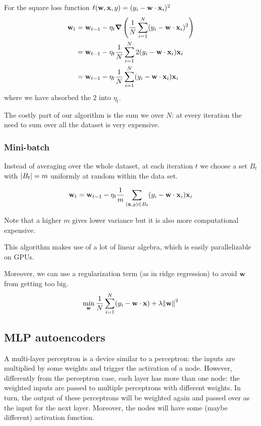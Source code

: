 \documentclass[12pt]{extarticle}
\renewcommand{\vec}[1]{\bvec{#1}}
\begin{document}
For the square loss function $\ell(\vec w, \vec x, y) = (y_i - \vec w \cdot \vec x_i)^2$
\begin{align}
	\vec w_{t} & = \vec w_{t-1} - \eta_t \grad \left(\frac{1}{N}\sum_{i = 1}^N (y_i - \vec w \cdot \vec x_i)^2 \right) \\
	           & = \vec w_{t-1} - \eta_t  \frac{1}{N}\sum_{i = 1}^N 2 (y_i - \vec w \cdot \vec x_i) \vec x_i           \\
	           & = \vec w_{t-1} - \eta_t  \frac{1}{N}\sum_{i = 1}^N (y_i - \vec w \cdot \vec x_i) \vec x_i
\end{align}
where we have absorbed the $2$ into $\eta_t$.

The costly part of our algorithm is the sum we over $N$: at every iteration the need to sum over all
the dataset is very expensive.

\subsubsection{Mini-batch}

Instead of averaging over the whole dataset, at each iteration $t$ we choose a set $B_t$ with
$\abs{B_t} = m$ uniformly at random within the data set.

\begin{equation}
	\vec w_{t} = \vec w_{t-1} - \eta_t  \frac{1}{m}\sum_{(\vec x, y) \in B_t}
	(y_i - \vec w \cdot \vec x_i) \vec x_i
\end{equation}

Note that a higher $m$ gives lower variance but it is also more computational expensive.

This algorithm makes use of a lot of linear algebra, which is easily parallelizable on GPUs.

Moreover, we can use a regularization term (as in ridge regression) to avoid $\vec w$ from getting
too big.
\begin{equation}
	\min_{\vec w} \frac{1}{N} \sum_{i = 1}^N (y_i - \vec w \cdot \vec x) + \lambda \norm{\vec w}^2
\end{equation}

\subsection{MLP autoencoders}

A multi-layer perceptron is a device similar to a perceptron: the inputs are multiplied by some
weights and trigger the activation of a node. However, differently from the perceptron case, each
layer has more than one node: the weighted inputs are passed to multiple perceptrons with different
weights. In turn, the output of these perceptrons will be weighted again and passed over as the
input for the next layer.
Moreover, the nodes will have some (maybe different) activation function.
\end{document}

